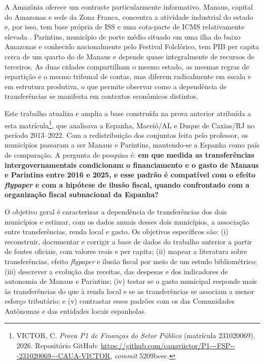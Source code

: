 A Amazônia oferece um contraste particularmente informativo. Manaus, capital do Amazonas e sede da Zona Franca, concentra a atividade industrial do estado e, por isso, tem base própria de ISS e uma cota-parte de ICMS relativamente elevada \cite{serafico2005}. Parintins, município de porte médio situado em uma ilha do baixo Amazonas e conhecido nacionalmente pelo Festival Folclórico, tem PIB per capita cerca de um quarto do de Manaus e depende quase integralmente de recursos de terceiros. As duas cidades compartilham o mesmo estado, as mesmas regras de repartição e o mesmo tribunal de contas, mas diferem radicalmente em escala e em estrutura produtiva, o que permite observar como a dependência de transferências se manifesta em contextos econômicos distintos.

Este trabalho atualiza e amplia a base construída na prova anterior atribuída a esta matrícula\footnote{VICTOR, C. \textit{Prova P1 de Finanças do Setor Público} (matrícula 231020069). 2026. Repositório GitHub: \url{https://github.com/cauaviictor/P1---FSP---231020069---CAUA-VICTOR}, \textit{commit} 5209bcec.}, que analisava a Espanha, Maceió/AL e Duque de Caxias/RJ no período 2013--2022. Com a redistribuição dos conjuntos feita pelo professor, os municípios passaram a ser Manaus e Parintins, mantendo-se a Espanha como país de comparação. A pergunta de pesquisa é: \textbf{em que medida as transferências intergovernamentais condicionam o financiamento e o gasto de Manaus e Parintins entre 2016 e 2025, e esse padrão é compatível com o efeito \textit{flypaper} e com a hipótese de ilusão fiscal, quando confrontado com a organização fiscal subnacional da Espanha?}

O objetivo geral é caracterizar a dependência de transferências dos dois municípios e estimar, com os dados anuais desses dois municípios, a associação entre transferências, renda local e gasto. Os objetivos específicos são: (i) reconstruir, documentar e corrigir a base de dados do trabalho anterior a partir de fontes oficiais, com valores reais e per capita; (ii) mapear a literatura sobre transferências, efeito \textit{flypaper} e ilusão fiscal por meio de um estudo bibliométrico; (iii) descrever a evolução das receitas, das despesas e dos indicadores de autonomia de Manaus e Parintins; (iv) testar se o gasto municipal responde mais às transferências do que à renda local e se as transferências se associam a menor esforço tributário; e (v) contrastar esses padrões com os das Comunidades Autônomas e das entidades locais espanholas.

